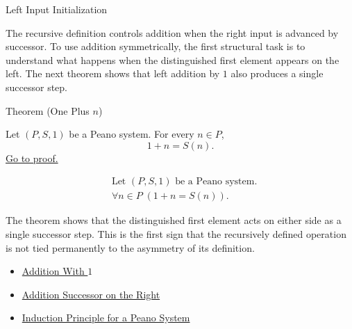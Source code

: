 \begin{topicbox}{Left Input Initialization}
\begin{exposition}
The recursive definition controls addition when the right input is advanced by
successor. To use addition symmetrically, the first structural task is to
understand what happens when the distinguished first element appears on the
left. The next theorem shows that left addition by $1$ also produces a single
successor step.
\end{exposition}

\begin{theorembox}{Theorem (One Plus \texorpdfstring{$n$}{n})}
\begin{theorem}
\label{thm:one-plus-n}
Let $(P,S,1)$ be a Peano system. For every $n \in P$,
\[
1+n=S(n).
\]
\hyperref[prf:one-plus-n]{Go to proof.}
\end{theorem}
\end{theorembox}

\begin{remark*}
\[
\begin{aligned}
&\text{Let } (P,S,1) \text{ be a Peano system.}\\
&\forall n \in P\;(1+n=S(n)).
\end{aligned}
\]
\end{remark*}

\begin{remark*}[Interpretation]
The theorem shows that the distinguished first element acts on either side as
a single successor step. This is the first sign that the recursively defined
operation is not tied permanently to the asymmetry of its definition.
\end{remark*}

\begin{dependencies}
\begin{itemize}
  \item \hyperref[thm:addition-with-one]{Addition With $1$}
  \item \hyperref[thm:addition-successor-on-right]{Addition Successor on the Right}
  \item \hyperref[thm:induction-principle-for-peano-system]{Induction Principle for a Peano System}
\end{itemize}
\end{dependencies}
\end{topicbox}

